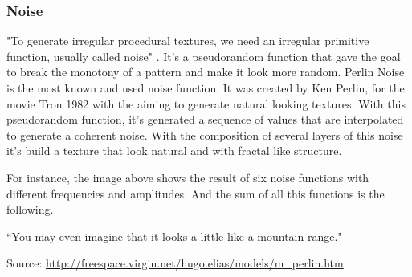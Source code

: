 
\subsubsection{Noise} %
\label{ssub:noise}


"To generate irregular procedural textures, we need an irregular primitive function,
usually called noise" \cite{Ebert2002}. It's a pseudorandom function that gave the goal to break the monotony of a pattern and make it look more random.
Perlin Noise is the most known and used noise function. It was created by Ken Perlin, for the movie Tron 1982 with the aiming to generate natural looking textures.
With this pseudorandom function, it's generated a sequence of values that are interpolated to generate a coherent noise. With the composition of several layers of this noise it's build a texture that look natural and with fractal like structure.




 For instance, the image above shows the result of six noise functions with different frequencies and amplitudes. And the sum of all this functions is the following.

``You may even imagine that it looks a little like a mountain range."

Source: \url{http://freespace.virgin.net/hugo.elias/models/m_perlin.htm}



